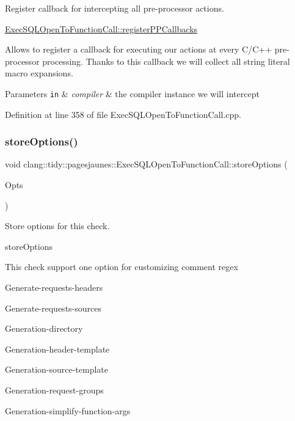 Register callback for intercepting all pre-\/processor actions. 

\hyperlink{classclang_1_1tidy_1_1pagesjaunes_1_1_exec_s_q_l_open_to_function_call_a85a5f5ed46dfa97a2cf12e5af10c1591}{Exec\+S\+Q\+L\+Open\+To\+Function\+Call\+::register\+P\+P\+Callbacks}

Allows to register a callback for executing our actions at every C/\+C++ pre-\/processor processing. Thanks to this callback we will collect all string literal macro expansions.


\begin{DoxyParams}[1]{Parameters}
\mbox{\tt in}  & {\em compiler} & the compiler instance we will intercept \\
\hline
\end{DoxyParams}


Definition at line 358 of file Exec\+S\+Q\+L\+Open\+To\+Function\+Call.\+cpp.

\mbox{\label{classclang_1_1tidy_1_1pagesjaunes_1_1_exec_s_q_l_open_to_function_call_a55b576bd9764d3756ec7a10340a2c339}} 
\subsubsection{\texorpdfstring{store\+Options()}{storeOptions()}}
{\footnotesize\ttfamily void clang\+::tidy\+::pagesjaunes\+::\+Exec\+S\+Q\+L\+Open\+To\+Function\+Call\+::store\+Options (\begin{DoxyParamCaption}\item[{Clang\+Tidy\+Options\+::\+Option\+Map \&}]{Opts }\end{DoxyParamCaption})\hspace{0.3cm}{\ttfamily [override]}}



Store options for this check. 

store\+Options

This check support one option for customizing comment regex
\begin{DoxyItemize}
\item Generate-\/requests-\/headers
\item Generate-\/requests-\/sources
\item Generation-\/directory
\item Generation-\/header-\/template
\item Generation-\/source-\/template
\item Generation-\/request-\/groups
\item Generation-\/simplify-\/function-\/args
\end{DoxyItemize}


